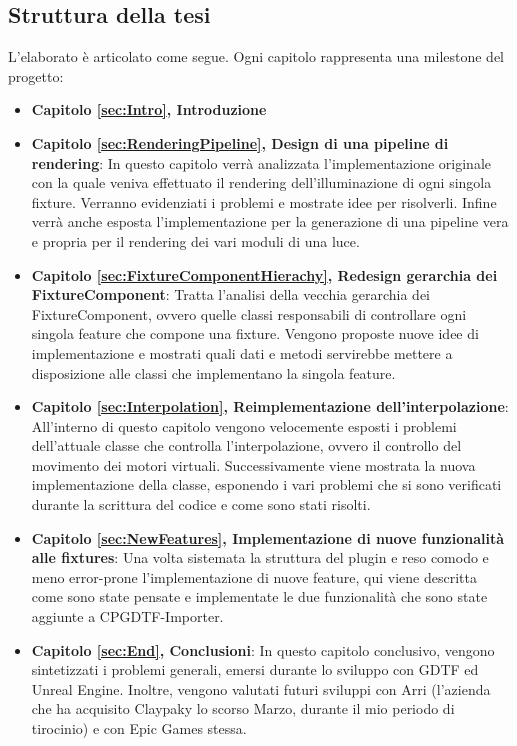 \documentclass[main.tex]{subfiles}
\begin{document}
\subsection{Struttura della tesi}\label{subsec:1_thesisInfo}
L'elaborato è articolato come segue. Ogni capitolo rappresenta una milestone del progetto:
\begin{itemize}
    \item \textbf{Capitolo \ref{sec:Intro}, Introduzione} %
    \item \textbf{Capitolo \ref{sec:RenderingPipeline}, Design di una pipeline di rendering}: In questo capitolo verrà analizzata l'implementazione originale con la quale veniva effettuato il rendering dell'illuminazione di ogni singola fixture. Verranno evidenziati i problemi e mostrate idee per risolverli. Infine verrà anche esposta l'implementazione per la generazione di una pipeline vera e propria per il rendering dei vari moduli di una luce. 
    \item \textbf{Capitolo \ref{sec:FixtureComponentHierachy}, Redesign gerarchia dei FixtureComponent}: Tratta l'analisi della vecchia gerarchia dei FixtureComponent, ovvero quelle classi responsabili di controllare ogni singola feature che compone una fixture. Vengono proposte nuove idee di implementazione e mostrati quali dati e metodi servirebbe mettere a disposizione alle classi che implementano la singola feature.
    \item \textbf{Capitolo \ref{sec:Interpolation}, Reimplementazione dell'interpolazione}: All'interno di questo capitolo vengono velocemente esposti i problemi dell'attuale classe che controlla l'interpolazione, ovvero il controllo del movimento dei motori virtuali. Successivamente viene mostrata la nuova implementazione della classe, esponendo i vari problemi che si sono verificati durante la scrittura del codice e come sono stati risolti.
    \item \textbf{Capitolo \ref{sec:NewFeatures}, Implementazione di nuove funzionalità alle fixtures}: Una volta sistemata la struttura del plugin e reso comodo e meno error-prone l'implementazione di nuove feature, qui viene descritta come sono state pensate e implementate le due funzionalità che sono state aggiunte a CPGDTF-Importer.
    \item \textbf{Capitolo \ref{sec:End}, Conclusioni}: In questo capitolo conclusivo, vengono sintetizzati i problemi generali, emersi durante lo sviluppo con GDTF ed Unreal Engine. Inoltre, vengono valutati futuri sviluppi con Arri (l'azienda che ha acquisito Claypaky lo scorso Marzo, durante il mio periodo di tirocinio) e con Epic Games stessa.
\end{itemize}
\end{document}
